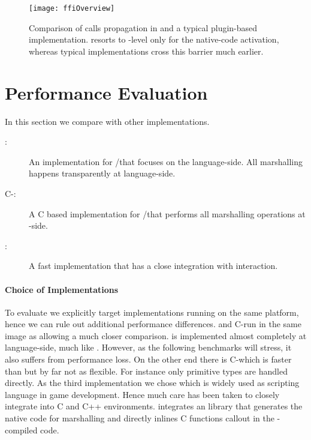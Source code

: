 \begin{figure*}[h]
	\begin{adjustwidth}{-2.0in}{-2.0in}
		\centering
		\texttt{[image: ffiOverview]}
	\end{adjustwidth}
	\caption[\FFI Implementation Comparison]{Comparison of \FFI calls propagation in \NBFFI and a typical \VM plugin-based implementation. \NB resorts to \VM-level only for the native-code activation, whereas typical implementations cross this barrier much earlier.}
\end{figure*}

\section{Performance Evaluation}

In this section we compare \NB with other \FFI implementations.
\begin{description}
	\item[\Alien \FFI:] An \FFI implementation for \Squeak/\PH that focuses on the lan\-guage-side. All marshalling happens transparently at language-side.
	\item[C-\FFI:] A C based \FFI implementation for \Squeak/\PH that performs all marshalling operations at \VM-side.
	\item[\LuaJIT:] A fast \Lua implementation that has a close \FFI integration with \JIT interaction.
\end{description}

\paragraph{Choice of \FFI Implementations}
To evaluate \NB we explicitly target \FFI implementations running on the same platform, hence we can rule out additional performance differences.
\Alien and C-\FFI run in the same \PH image as \NB allowing a much closer comparison.
\Alien \FFI is implemented almost completely at language-side, much like \NB.
However, as the following benchmarks will stress, it also suffers from performance loss.
On the other end there is C-\FFI which is faster than \Alien but by far not as flexible.
For instance only primitive types are handled directly.
As the third implementation we chose \Lua which is widely used as scripting language in game development.
Hence much care has been taken to closely integrate \Lua into C and C++ environments.
\LuaJIT integrates an \FFI library that generates the native code for marshalling and directly inlines C functions callout in the \JIT-compiled code.


